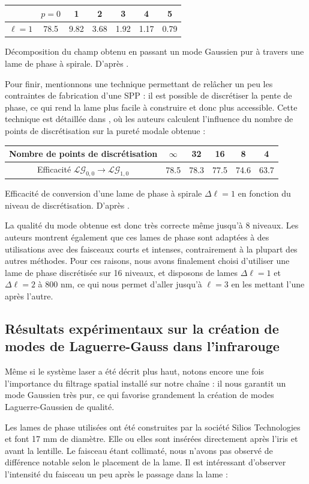 \begin{center}
  \begin{tabular}{| c | c | c | c | c | c | c |}
    \hline
		& $p = 0$ & 1 & 2 & 3 & 4 & 5 \\ \hline
    $\ell=1$ & 78.5 & 9.82 & 3.68 & 1.92 & 1.17 & 0.79 \\ \hline
  \end{tabular}
	\caption{Décomposition du champ obtenu en passant un mode Gaussien pur à travers une lame de phase à spirale. D'après .}
	\label{Tab:DecompBei}
\end{center}
Pour finir, mentionnons une technique permettant de relâcher un peu les contraintes de fabrication d'une SPP : il est possible de discrétiser la pente de phase, ce qui rend la lame plus facile à construire et donc plus accessible. Cette technique est détaillée dans , où les auteurs calculent l'influence du nombre de points de discrétisation sur la pureté modale obtenue :
\begin{center}
  \begin{tabular}{| c | c | c | c | c | c |}
    \hline
		Nombre de points de discrétisation & $\infty$ & 32 & 16 & 8 & 4 \\ \hline
    Efficacité $\mathcal{LG}_{0,0}\rightarrow\mathcal{LG}_{1,0}$ & 78.5 & 78.3 & 77.5 & 74.6 & 63.7 \\ \hline
  \end{tabular}
	\caption{Efficacité de conversion d'une lame de phase à spirale $\Delta\ell=1$ en fonction du niveau de discrétisation. D'après .}
	\label{Tab:DecompSueda}
\end{center}
La qualité du mode obtenue est donc très correcte même jusqu'à 8 niveaux. Les auteurs montrent également que ces lames de phase sont adaptées à des utilisations avec des faisceaux courts et intenses, contrairement à la plupart des autres méthodes. Pour ces raisons, nous avons finalement choisi d'utiliser une lame de phase discrétisée sur 16 niveaux, et disposons de lames $\Delta\ell = 1$ et $\Delta\ell = 2$ à 800 nm, ce qui nous permet d'aller jusqu’à $\ell = 3$ en les mettant l'une après l'autre.

\subsection{Résultats expérimentaux sur la création de modes de Laguerre-Gauss dans l'infrarouge}
\label{sec:spp}
Même si le système laser a été décrit plus haut, notons encore une fois l'importance du filtrage spatial installé sur notre chaîne : il nous garantit un mode Gaussien très pur, ce qui favorise grandement la création de modes Laguerre-Gaussien de qualité. \par
Les lames de phase utilisées ont été construites par la société Silios Technologies et font 17 mm de diamètre. Elle ou elles sont insérées directement après l'iris et avant la lentille. Le faisceau étant collimaté, nous n'avons pas observé de différence notable selon le placement de la lame. Il est intéressant d'observer l'intensité du faisceau un peu après le passage dans la lame : 

